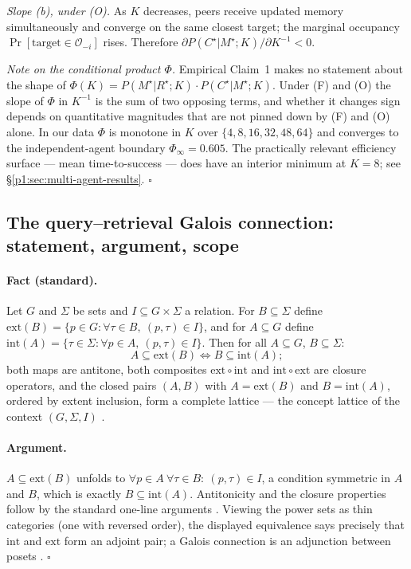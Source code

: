 \documentclass{article}
\begin{document}
\emph{Slope (b), under (O).} As $K$ decreases, peers receive updated memory simultaneously and converge on the same closest target; the marginal occupancy $\Pr[\text{target}\in\mathcal{O}_{-i}]$ rises. Therefore $\partial P(C^\star|M^\star;K) / \partial K^{-1} < 0$.

\emph{Note on the conditional product $\Phi$.} Empirical Claim~1 makes no statement about the shape of $\Phi(K) = P(M^\star|R^\star;K)\!\cdot\!P(C^\star|M^\star;K)$. Under (F) and (O) the slope of $\Phi$ in $K^{-1}$ is the sum of two opposing terms, and whether it changes sign depends on quantitative magnitudes that are not pinned down by (F) and (O) alone. In our data $\Phi$ is monotone in $K$ over $\{4,8,16,32,48,64\}$ and converges to the independent-agent boundary $\Phi_\infty = 0.605$. The practically relevant efficiency surface --- mean time-to-success --- does have an interior minimum at $K=8$; see \S\ref{p1:sec:multi-agent-results}. \hfill$\square$

\subsection{The query--retrieval Galois connection: statement, argument, scope}
\label{p1:app:galois}

\paragraph{Fact (standard).}
Let $G$ and $\Sigma$ be sets and $I \subseteq G \times \Sigma$ a relation. For $B \subseteq \Sigma$ define $\mathrm{ext}(B) = \{p \in G : \forall \tau \in B,\ (p,\tau) \in I\}$, and for $A \subseteq G$ define $\mathrm{int}(A) = \{\tau \in \Sigma : \forall p \in A,\ (p,\tau) \in I\}$. Then for all $A \subseteq G$, $B \subseteq \Sigma$:
\[
A \subseteq \mathrm{ext}(B) \iff B \subseteq \mathrm{int}(A);
\]
both maps are antitone, both composites $\mathrm{ext}\circ\mathrm{int}$ and $\mathrm{int}\circ\mathrm{ext}$ are closure operators, and the closed pairs $(A, B)$ with $A = \mathrm{ext}(B)$ and $B = \mathrm{int}(A)$, ordered by extent inclusion, form a complete lattice --- the concept lattice of the context $(G, \Sigma, I)$ \citep{ganter1999fca}.

\paragraph{Argument.}
$A \subseteq \mathrm{ext}(B)$ unfolds to $\forall p \in A\ \forall \tau \in B:\ (p,\tau) \in I$, a condition symmetric in $A$ and $B$, which is exactly $B \subseteq \mathrm{int}(A)$. Antitonicity and the closure properties follow by the standard one-line arguments \citep[Ch.~1]{ganter1999fca}. Viewing the power sets as thin categories (one with reversed order), the displayed equivalence says precisely that $\mathrm{int}$ and $\mathrm{ext}$ form an adjoint pair; a Galois connection is an adjunction between posets \citep[Ch.~IV]{maclane1998categories}. \hfill$\square$
\end{document}
